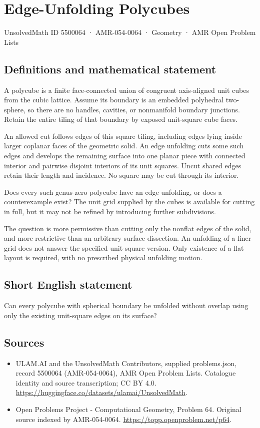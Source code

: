 \documentclass[11pt,a4paper]{article}
\begin{document}
\section*{Edge-Unfolding Polycubes}\label{5500064}
{\small UnsolvedMath ID 5500064 · AMR-054-0064 · Geometry · AMR Open Problem Lists}
\subsection{Definitions and mathematical statement}
A polycube is a finite face-connected union of congruent axis-aligned
unit cubes from the cubic lattice. Assume its boundary is an
embedded polyhedral two-sphere, so there are no handles, cavities,
or nonmanifold boundary junctions. Retain the entire tiling of
that boundary by exposed unit-square cube faces.

An allowed cut follows edges of this square tiling, including
edges lying inside larger coplanar faces of the geometric solid.
An edge unfolding cuts some such edges and develops the remaining
surface into one planar piece with connected interior and
pairwise disjoint interiors of its unit squares. Uncut shared
edges retain their length and incidence. No square may be cut
through its interior.

Does every such genus-zero polycube have an edge unfolding, or
does a counterexample exist? The unit grid supplied by the cubes
is available for cutting in full, but it may not be refined by
introducing further subdivisions.

The question is more permissive than cutting only the nonflat
edges of the solid, and more restrictive than an arbitrary
surface dissection. An unfolding of a finer grid does not answer
the specified unit-square version. Only existence of a flat
layout is required, with no prescribed physical unfolding motion.
\subsection{Short English statement}
Can every polycube with spherical boundary be unfolded without
overlap using only the existing unit-square edges on its surface?
\subsection{Sources}
\begin{itemize}
\item[S1] ULAM.AI and the UnsolvedMath Contributors, supplied problems.json, record 5500064 (AMR-054-0064), AMR Open Problem Lists. Catalogue identity and source transcription; CC BY 4.0.
\url{https://huggingface.co/datasets/ulamai/UnsolvedMath}.
\item[S2] Open Problems Project - Computational Geometry, Problem 64. Original source indexed by AMR-054-0064.
\url{https://topp.openproblem.net/p64}.
\end{itemize}
\end{document}
